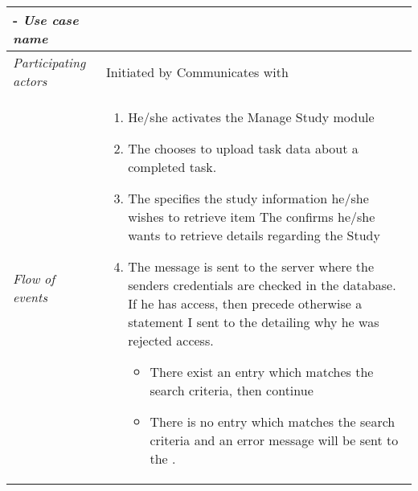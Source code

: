 
%



%
%
\begin{table}[H]
\tabulinesep=1.5mm
\begin{tabu} to 
	\tabucline[1.5pt]-
	\textit{Use case name} & \RetrieveStudyInformation \\
	\hline
	\textit{Participating actors} & Initiated by \client \newline Communicates with \serverside \\
	\hline
	\textit{Flow of events} &
	\vspace{-3mm}
	\begin{enumerate}[leftmargin=*,topsep=0pt,itemsep=-1ex]
		\item He/she activates the Manage Study module
		\item The \client chooses to upload task data about a completed task.
		\item The \client specifies the study information he/she wishes to retrieve
		item The \client confirms he/she wants to retrieve details regarding the Study
		\item The message is sent to the server where the senders credentials are checked in the database. If he has access, then precede otherwise a statement I sent to the \client detailing why he was rejected access.
		\begin{itemize} 
			\item There exist an entry which matches the search criteria, then continue 
			\item There is no entry which matches the search criteria and an error message will be sent to the \client.
		\end{itemize}
				

\end{enumerate}
\end{tabu}
\end{table}
